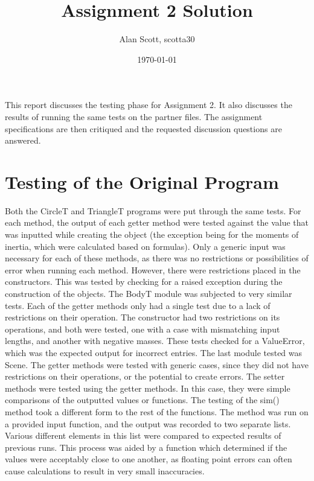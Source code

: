 \documentclass[12pt]{article}
\title{Assignment 2 Solution}
\author{Alan Scott, scotta30}
\date{\today}
\begin{document}
\maketitle

This report discusses the testing phase for Assignment 2. It also discusses the results
of running the same tests on the partner files. The assignment specifications
are then critiqued and the requested discussion questions are answered.

\section{Testing of the Original Program}
Both the CircleT and TriangleT programs were put through the same tests. For each method, the output of each getter method were tested against the value that was inputted while creating the object (the exception being for the moments of inertia, which were calculated based on formulas). Only a generic input was necessary for each of these methods, as there was no restrictions or possibilities of error when running each method. However, there were restrictions placed in the constructors. This was tested by checking for a raised exception during the construction of the objects. The BodyT module was subjected to very similar tests. Each of the getter methods only had a single test due to a lack of restrictions on their operation. The constructor had two restrictions on its operations, and both were tested, one with a case with mismatching input lengths, and another with negative masses. These tests checked for a ValueError, which was the expected output for incorrect entries. The last module tested was Scene. The getter methods were tested with generic cases, since they did not have restrictions on their operations, or the potential to create errors. The setter methods were tested using the getter methods. In this case, they were simple comparisons of the outputted values or functions. The testing of the sim() method took a different form to the rest of the functions. The method was run on a provided input function, and the output was recorded to two separate lists. Various different elements in this list were compared to expected results of previous runs. This process was aided by a function which determined if the values were acceptably close to one another, as floating point errors can often cause calculations to result in very small inaccuracies. 
\end{document}
